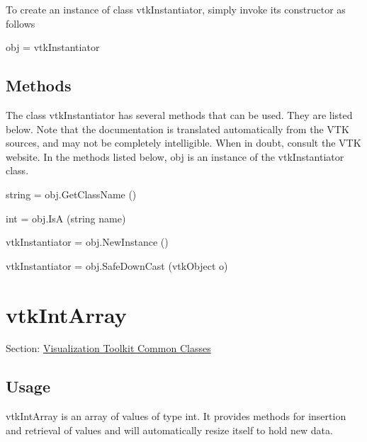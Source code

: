 To create an instance of class vtk\-Instantiator, simply invoke its constructor as follows \begin{DoxyVerb}  obj = vtkInstantiator
\end{DoxyVerb}
 \hypertarget{vtkwidgets_vtkxyplotwidget_Methods}{}\subsection{Methods}\label{vtkwidgets_vtkxyplotwidget_Methods}
The class vtk\-Instantiator has several methods that can be used. They are listed below. Note that the documentation is translated automatically from the V\-T\-K sources, and may not be completely intelligible. When in doubt, consult the V\-T\-K website. In the methods listed below, {\ttfamily obj} is an instance of the vtk\-Instantiator class. 
\begin{DoxyItemize}
\item {\ttfamily string = obj.\-Get\-Class\-Name ()}  
\item {\ttfamily int = obj.\-Is\-A (string name)}  
\item {\ttfamily vtk\-Instantiator = obj.\-New\-Instance ()}  
\item {\ttfamily vtk\-Instantiator = obj.\-Safe\-Down\-Cast (vtk\-Object o)}  
\end{DoxyItemize}\hypertarget{vtkcommon_vtkintarray}{}\section{vtk\-Int\-Array}\label{vtkcommon_vtkintarray}
Section\-: \hyperlink{sec_vtkcommon}{Visualization Toolkit Common Classes} \hypertarget{vtkwidgets_vtkxyplotwidget_Usage}{}\subsection{Usage}\label{vtkwidgets_vtkxyplotwidget_Usage}
vtk\-Int\-Array is an array of values of type int. It provides methods for insertion and retrieval of values and will automatically resize itself to hold new data.

